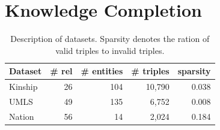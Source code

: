 \section{Knowledge Completion}
\label{sec:exp1}

\begin{table}[t]
\centering
\caption{\label{tbl:dataset}Description of datasets. 
Sparsity denotes the ration of valid triples to invalid triples.}
\vskip 0.15in
\begin{tabular}{l | r | r | r | r}
Dataset &  \# rel & \# entities & \# triples & sparsity \\ \hline
Kinship & 26 & 104  & 10,790 & 0.038 \\
UMLS & 49 &135  & 6,752 & 0.008 \\
Nation & 56 & 14  & 2,024 & 0.184 \\
\end{tabular}
\end{table}


